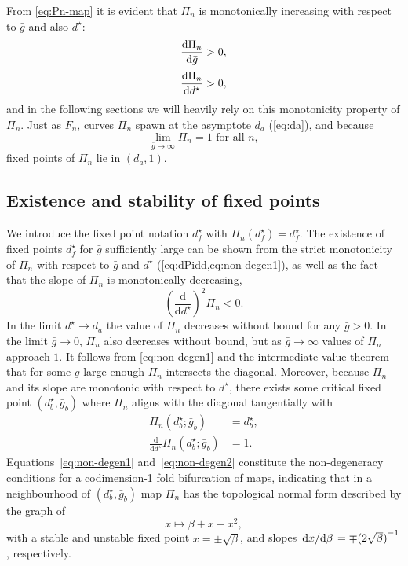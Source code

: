 \documentclass[utf8,draft]{frontiersFPHY} %
\renewcommand{\d}{\mathrm{d}}
\newcommand{\dstar}{d^\star}
\newcommand{\gbar}{\bar g}
\begin{document}
From \cref{eq:Pn-map} it is evident that $\Pi_{n}$ is monotonically increasing with respect to $\gbar$ and also $\dstar$:
\begin{align}
  \label{eq:non-degen1}
  \dv{\Pi_{n}}{\gbar}&>0,\\[0.5ex]
  \label{eq:dPidd}
  \dv{\Pi_{n}}{\dstar}&>0,
\end{align}
and in the following sections we will heavily rely on this monotonicity property of $\Pi_n$.
Just as $F_{n}$, curves $\Pi_{n}$ spawn at the asymptote $d_{a}$ (\cref{eq:da}), and because
\begin{equation}
  \lim_{\gbar \to \infty}\Pi_{n} = 1\text{ for all }n,
\end{equation}
fixed points of $\Pi_{n}$ lie in $(d_{a}, 1)$.

\subsection{Existence and stability of fixed points}
We introduce the fixed point notation $\dstar_{f}$ with $\Pi_{n}(\dstar_{f})=\dstar_{f}$.
The existence of fixed points $\dstar_{f}$ for $\gbar$ sufficiently large can be shown from the strict monotonicity of $\Pi_{n}$ with respect to $\gbar$ and $\dstar$ (\cref{eq:dPidd,eq:non-degen1}), as well as the fact that the slope of $\Pi_{n}$ is monotonically decreasing,
\begin{equation}
  \label{eq:non-degen2}
  \left(\frac{\mathrm{d}}{\mathrm{d}\dstar}\right)^2 \Pi_{n}<0.
\end{equation}
In the limit $\dstar \to d_{a}$ the value of $\Pi_n$ decreases without bound for any $\gbar>0$.
In the limit $\gbar \to 0$, $\Pi_n$ also decreases without bound, but as $\gbar \to \infty$ values of $\Pi_n$ approach $1$.
It follows from \cref{eq:non-degen1} and the intermediate value theorem that for some $\gbar$ large enough $\Pi_n$ intersects the diagonal.
Moreover, because $\Pi_n$ and its slope are monotonic with respect to $\dstar$, there exists some critical fixed point $(\dstar_b, \gbar_b)$ where $\Pi_n$ aligns with the diagonal tangentially with
\begin{align}
  \Pi_{n}(\dstar_{b}; \gbar_{b}) &=\dstar_{b},\\
  \frac{\d}{\d \dstar}\Pi_{n}(\dstar_{b}; \gbar_{b})&=1.
\end{align}
Equations~\eqref{eq:non-degen1} and~\eqref{eq:non-degen2} constitute the non-degeneracy conditions for a codimension-1 fold bifurcation of maps, indicating that in a neighbourhood of $(\dstar_{b}, \gbar_{b})$ map $\Pi_{n}$ has the topological normal form described by the graph of
\begin{equation}
  \label{eq:normal-form}
  x\mapsto \beta+x-x^{2},
\end{equation}
with a stable and unstable fixed point $x=\pm\sqrt{\beta}$, and slopes $\dv*{x}{\beta}=\mp {(2\sqrt{\beta})}^{-1}$, respectively.
\end{document}
